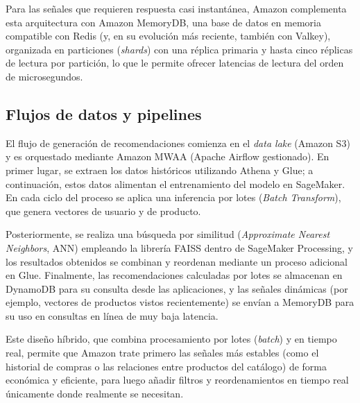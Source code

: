 \documentclass[12pt,a4paper]{article}
\begin{document}
Para las señales que requieren respuesta casi instantánea, Amazon complementa
esta arquitectura con Amazon MemoryDB, una base de datos en memoria compatible
con Redis (y, en su evolución más reciente, también con Valkey), organizada
en particiones (\textit{shards}) con una réplica primaria y hasta cinco
réplicas de lectura por partición, lo que le permite ofrecer latencias de
lectura del orden de microsegundos.

\subsection{Flujos de datos y pipelines}
El flujo de generación de recomendaciones comienza en el \textit{data lake}
(Amazon S3) y es orquestado mediante Amazon MWAA (Apache Airflow gestionado).
En primer lugar, se extraen los datos históricos utilizando Athena y Glue; a
continuación, estos datos alimentan el entrenamiento del modelo en SageMaker.
En cada ciclo del proceso se aplica una inferencia por lotes (\textit{Batch
Transform}), que genera vectores de usuario y de producto.

Posteriormente, se realiza una búsqueda por similitud (\textit{Approximate
Nearest Neighbors}, ANN) empleando la librería FAISS dentro de SageMaker
Processing, y los resultados obtenidos se combinan y reordenan mediante un
proceso adicional en Glue. Finalmente, las recomendaciones calculadas por
lotes se almacenan en DynamoDB para su consulta desde las aplicaciones, y las
señales dinámicas (por ejemplo, vectores de productos vistos recientemente) se
envían a MemoryDB para su uso en consultas en línea de muy baja latencia.

Este diseño híbrido, que combina procesamiento por lotes (\textit{batch}) y en
tiempo real, permite que Amazon trate primero las señales más estables (como
el historial de compras o las relaciones entre productos del catálogo) de
forma económica y eficiente, para luego añadir filtros y reordenamientos en
tiempo real únicamente donde realmente se necesitan.
\end{document}
